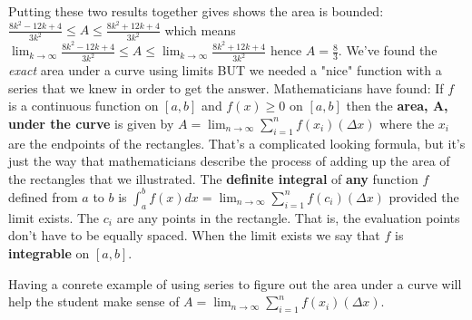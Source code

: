 \documentclass[12pt]{article}
\begin{document}
Putting these two results together gives shows the area is 
bounded: $\frac{8k^2-12k+4}{3k^2} \leq A \leq \frac{8k^2+12k+4}{3k^2}$ which means
$\lim_{k \to \infty}\frac{8k^2-12k+4}{3k^2} \leq A \leq \lim_{k \to \infty}\frac{8k^2+12k+4}{3k^2}$ hence
$A=\frac{8}{3}$.  We've found the {\em exact} area under a 
curve using limits BUT we needed a "nice" function with a
series that we knew in order to get the answer. 
Mathematicians have found: If $f$ is a continuous function on $\left[a,b\right]$ and $f(x) \geq 0$ on 
$\left[a,b\right]$ then the {\bf area, A, under the curve} is given by $A=\lim_{n \to \infty}\sum_{i=1}^{n}f(x_i)
(\Delta x)$ where the $x_i$ are the endpoints of the rectangles.
That's a complicated looking formula, but it's just the way that
mathematicians describe the process of adding up the area
of the rectangles that we illustrated. The {\bf definite integral} of 
{\bf any} function $f$ defined from $a$ to $b$ is $\int_a^bf(x)dx=
\lim_{n \to \infty} \sum_{i=1}^nf(c_i)(\Delta x)$ provided the 
limit exists. The $c_i$ are any points in the rectangle. That is, the 
evaluation points don't have to be equally spaced. When 
the limit exists we say that $f$ is {\bf integrable} on $\left[a,b
\right]$.

Having a conrete example of using series to figure out the area
under a curve will help the student make sense
of $A=\lim_{n \to \infty}\sum_{i=1}^{n}f(x_i)(\Delta x)$.
\end{document}
